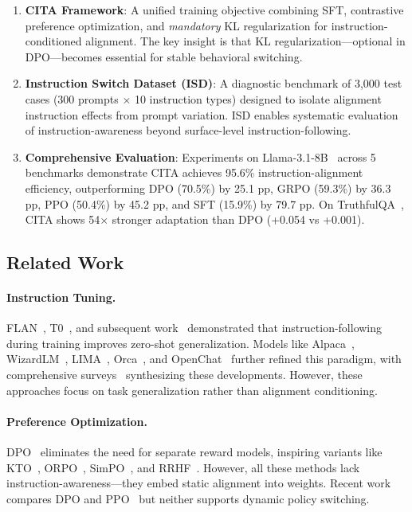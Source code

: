 \begin{enumerate}[leftmargin=*,itemsep=2pt]
    \item \textbf{CITA Framework}: A unified training objective combining SFT, contrastive preference optimization, and \textit{mandatory} KL regularization for instruction-conditioned alignment. The key insight is that KL regularization---optional in DPO---becomes essential for stable behavioral switching.

    \item \textbf{Instruction Switch Dataset (ISD)}: A diagnostic benchmark of 3,000 test cases (300 prompts $\times$ 10 instruction types) designed to isolate alignment instruction effects from prompt variation. ISD enables systematic evaluation of instruction-awareness beyond surface-level instruction-following.

    \item \textbf{Comprehensive Evaluation}: Experiments on Llama-3.1-8B~\cite{dubey2024llama} across 5 benchmarks demonstrate CITA achieves 95.6\% instruction-alignment efficiency, outperforming DPO (70.5\%) by 25.1 pp, GRPO (59.3\%) by 36.3 pp, PPO (50.4\%) by 45.2 pp, and SFT (15.9\%) by 79.7 pp. On TruthfulQA~\cite{lin2022truthfulqa}, CITA shows 54$\times$ stronger adaptation than DPO (+0.054 vs +0.001).
\end{enumerate}

\vspace{-3mm}
\subsection{Related Work}
\label{sec:related_work}

\paragraph{Instruction Tuning.} FLAN~\cite{wei2022finetuned,chung2022scaling,longpre2023flan}, T0~\cite{sanh2022multitask}, and subsequent work~\cite{wang2023self,iyer2022opt,mishra2022cross} demonstrated that instruction-following during training improves zero-shot generalization. Models like Alpaca~\cite{taori2023alpaca}, WizardLM~\cite{xu2023wizardlm}, LIMA~\cite{zhou2023lima}, Orca~\cite{mukherjee2023orca}, and OpenChat~\cite{wang2023openchat} further refined this paradigm, with comprehensive surveys~\cite{peng2023instruction} synthesizing these developments. However, these approaches focus on task generalization rather than alignment conditioning.

\paragraph{Preference Optimization.} DPO~\cite{rafailov2023direct} eliminates the need for separate reward models, inspiring variants like KTO~\cite{ethayarajh2024kto}, ORPO~\cite{hong2024orpo}, SimPO~\cite{meng2024simpo}, and RRHF~\cite{yuan2023rrhf}. However, all these methods lack instruction-awareness---they embed static alignment into weights. Recent work~\cite{xu2024dpo} compares DPO and PPO~\cite{schulman2017proximal} but neither supports dynamic policy switching.

